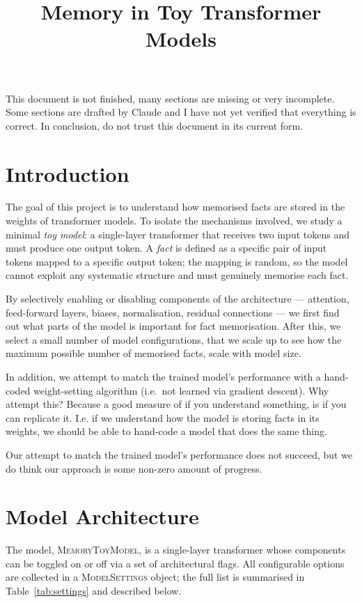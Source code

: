 \documentclass[11pt,a4paper]{article}
\title{Memory in Toy Transformer Models}
\author{}
\date{}
\begin{document}
\maketitle

This document is not finished, many sections are missing or very incomplete. Some sections are drafted by Claude and I have not yet verified that everything is correct. In conclusion, do not trust this document in its current form.

\section{Introduction}

The goal of this project is to understand how memorised facts are stored in the weights of transformer models. To isolate the mechanisms involved, we study a minimal \emph{toy model}: a single-layer transformer that receives two input tokens and must produce one output token. A \emph{fact} is defined as a specific pair of input tokens mapped to a specific output token; the mapping is random, so the model cannot exploit any systematic structure and must genuinely memorise each fact.

By selectively enabling or disabling components of the architecture --- attention, feed-forward layers, biases, normalisation, residual connections --- we first find out what parts of the model is important for fact memorisation. After this, we select a small number of model configurations, that we scale up to see how the maximum possible number of memorised facts, scale with model size.

In addition, we attempt to match the trained model's performance with a hand-coded weight-setting algorithm (i.e.\ not learned via gradient descent). Why attempt this? Because a good measure of if you understand something, is if you can replicate it. I.e. if we understand how the model is storing facts in its weights, we should be able to hand-code a model that does the same thing.

Our attempt to match the trained model's performance does not succeed, but we do think our approach is some non-zero amount of progress.

\section{Model Architecture}
\label{sec:architecture}

The model, \textsc{MemoryToyModel}, is a single-layer transformer whose components can be toggled on or off via a set of architectural flags. All configurable options are collected in a \textsc{ModelSettings} object; the full list is summarised in Table~\ref{tab:settings} and described below.
\end{document}
